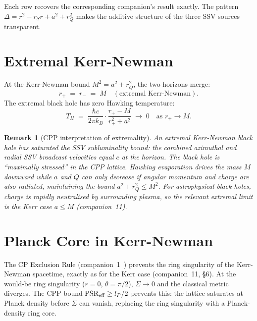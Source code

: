 \documentclass[12pt]{article}
\newtheorem{remark}[theorem]{Remark}
\newcommand{\lP}{l_P}
\newcommand{\rQ}{r_Q}
\newcommand{\rplus}{r_+}
\newcommand{\rminus}{r_-}
\newcommand{\PSR}{\mathrm{PSR}}
\newcommand{\Sig}{\Sigma}
\newcommand{\Dlt}{\Delta}
\begin{document}
\noindent Each row recovers the corresponding companion's result exactly.
The pattern $\Dlt = r^2 - r_S r + a^2 + \rQ^2$ makes the additive
structure of the three SSV sources transparent.

\section{Extremal Kerr-Newman}
\label{sec:extremal}

At the Kerr-Newman bound $M^2 = a^2 + \rQ^2$, the two horizons merge:
\begin{equation}
  \rplus \;=\; \rminus \;=\; M
  \quad (\text{extremal Kerr-Newman}).
  \label{eq:extremal}
\end{equation}
The extremal black hole has zero Hawking temperature:
\begin{equation}
  T_H \;=\; \frac{\hbar c}{2\pi k_B}\cdot
  \frac{\rplus - M}{\rplus^2 + a^2}
  \;\longrightarrow\; 0
  \quad\text{as } \rplus \to M.
  \label{eq:TH_extremal}
\end{equation}

\begin{remark}[CPP interpretation of extremality]
An extremal Kerr-Newman black hole has saturated the SSV subluminality
bound: the combined azimuthal and radial SSV broadcast velocities equal
$c$ at the horizon.  The black hole is ``maximally stressed'' in the
CPP lattice.  Hawking evaporation drives the mass $M$ downward while
$a$ and $Q$ can only decrease if angular momentum and charge are also
radiated, maintaining the bound $a^2 + \rQ^2 \leq M^2$.  For
astrophysical black holes, charge is rapidly neutralised by surrounding
plasma, so the relevant extremal limit is the Kerr case $a \leq M$
(companion~11).
\end{remark}

\section{Planck Core in Kerr-Newman}
\label{sec:planck_core}

The CP Exclusion Rule (companion~1~\cite{c1}) prevents the ring
singularity of the Kerr-Newman spacetime, exactly as for the Kerr
case (companion~11, §6).  At the would-be ring singularity
($r = 0$, $\theta = \pi/2$), $\Sig \to 0$ and the classical metric
diverges.  The CPP bound $\PSR_{\rm eff} \geq \lP/2$ prevents this:
the lattice saturates at Planck density before $\Sig$ can vanish,
replacing the ring singularity with a Planck-density ring core.
\end{document}
